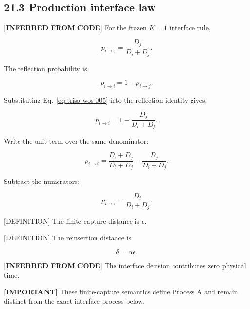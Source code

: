\documentclass[11pt,a4paper]{article}
\begin{document}
\subsection*{21.3 Production interface law}

\textbf{[INFERRED FROM CODE]} For the frozen $K=1$ interface rule,

\begin{equation}
\boxed{
p_{i\rightarrow j}
=
\frac{D_j}{D_i+D_j}.
}
\tag{TRISO-WOS-005}
\label{eq:triso-wos-005}
\end{equation}

The reflection probability is

\begin{equation}
p_{i\rightarrow i}
=
1-p_{i\rightarrow j}.
\tag{TRISO-WOS-006}
\label{eq:triso-wos-006}
\end{equation}

Substituting Eq.~\eqref{eq:triso-wos-005} into the reflection identity gives:

\begin{equation}
p_{i\rightarrow i}
=
1-\frac{D_j}{D_i+D_j}.
\tag{TRISO-WOS-007}
\label{eq:triso-wos-007}
\end{equation}

Write the unit term over the same denominator:

\begin{equation}
p_{i\rightarrow i}
=
\frac{D_i+D_j}{D_i+D_j}
-
\frac{D_j}{D_i+D_j}.
\tag{TRISO-WOS-008}
\label{eq:triso-wos-008}
\end{equation}

Subtract the numerators:

\begin{equation}
\boxed{
p_{i\rightarrow i}
=
\frac{D_i}{D_i+D_j}.
}
\tag{TRISO-WOS-009}
\label{eq:triso-wos-009}
\end{equation}

[DEFINITION] The finite capture distance is $\epsilon$.

[DEFINITION] The reinsertion distance is

\begin{equation}
\boxed{\delta=\alpha\epsilon.}
\tag{TRISO-WOS-010}
\label{eq:triso-wos-010}
\end{equation}

\textbf{[INFERRED FROM CODE]} The interface decision contributes zero physical time.

\textbf{[IMPORTANT]} These finite-capture semantics define Process A and remain distinct from the exact-interface process below.
\end{document}
